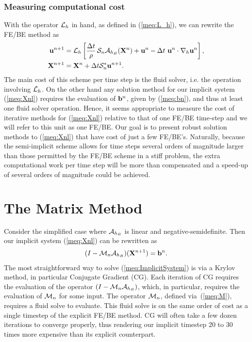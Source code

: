 \subsection{Measuring computational cost}
With the operator $\mathcal{L}_h$ in hand, as defined in (\ref{meq:L_h}), we can rewrite the FE/BE method as
\begin{align}
\mathbf{u}^{n+1} &= \mathcal{L}_h \left[\frac{\Delta t}{\rho}\, \mathcal{S}_n\mathcal{A}_{h_B}(\mathbf{X}^{n})+\mathbf{u}^n-\Delta t \, \, \mathbf{u}^n \cdot \nabla_h \mathbf{u}^n\right], \label{meq:FE} \\
\mathbf{X}^{n+1}&=\mathbf{X}^n +\Delta t\mathcal{S}^*_n\mathbf{u}^{n+1}. \label{meq:BE}
\end{align}
The main cost of this scheme per time step is the fluid solver, i.e. the operation involving $\mathcal{L}_h$.  On the other hand
any solution method for our implicit system (\ref{meq:Xnl}) requires the evaluation of $\mathbf{b}^n$, given by (\ref{meq:bn}), and thus  at
least one fluid solver operation. Hence, it seems appropriate to measure the cost of iterative methods for (\ref{meq:Xnl}) relative to that 
of one FE/BE time-step and we will refer to this unit as one FE/BE. 
Our goal is to present robust solution methods to (\ref{meq:Xnl}) that have cost of just a few FE/BE's. Naturally, 
because the semi-implicit scheme allows for time steps several orders of magnitude larger than those permitted by the FE/BE scheme in a stiff problem,  the extra computational work per time step will be more than compensated and a speed-up of several orders of magnitude could be achieved.


\chapter{The Matrix Method}
\label{part:Matrix}
\noindent
Consider the simplified case where $\mathcal{A}_{h_B}$ is linear and negative-semidefinite. Then our implicit system (\ref{meq:Xnl}) can be rewritten as
\begin{equation}
(I - \mathcal{M}_n\mathcal{A}_{h_B}) (\mathbf{X}^{n+1}) = \mathbf{b}^n. \label{meq:ImplicitSystem}
\end{equation}
The most straightforward way to solve (\ref{meq:ImplicitSystem}) is via a Krylov method, in particular Conjugate Gradient (CG). Each iteration of CG requires the evaluation of the operator $(I - \mathcal{M}_n\mathcal{A}_{h_B})$, which, in particular, requires the evaluation of $\mathcal{M}_n$ for some input. The operator $\mathcal{M}_n$, defined via~(\ref{meq:M}), requires a fluid solve to evaluate. This fluid solve is on the same order of cost as a single timestep of the explicit FE/BE method. CG will often take a few dozen iterations to converge properly, thus rendering our implicit timestep $20$ to $30$ times more expensive than its explicit counterpart.

